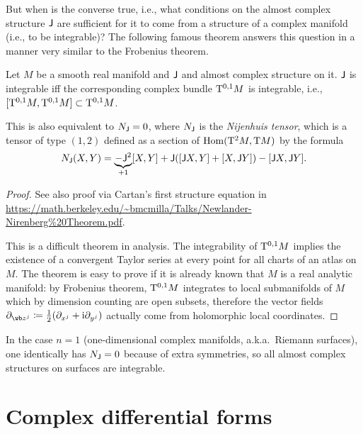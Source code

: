 But when is the converse true, i.e., what conditions on the almost complex structure $\mathsf{J}$ are sufficient for it to come from a structure of a complex manifold (i.e., to be integrable)? The following famous theorem answers this question in a manner very similar to the Frobenius theorem.

\begin{thm}
    Let $M$ be a smooth real manifold and $\mathsf{J}$ and almost complex structure on it. $\mathsf{J}$ is integrable iff the corresponding complex bundle $\mathrm{T}^{0,1}M$ is integrable, i.e., $[\mathrm{T}^{0,1}M,\mathrm{T}^{0,1}M]\subset \mathrm{T}^{0,1}M$.
    
    This is also equivalent to $N_{\mathsf{J}}=0$, where $N_{\mathsf{J}}$ is the \emph{Nijenhuis tensor}, which is a tensor of type $(1,2)$ defined as a section of $\operatorname{Hom}(\mathrm{T}^2M,\mathrm{T} M)$ by the formula
    \[N_{\mathsf{J}}(X,Y)=\underbrace{-\mathsf{J}^2}_{+1}[X,Y]+\mathsf{J}([\mathsf{J} X,Y]+[X,\mathsf{J} Y])-[\mathsf{J} X,\mathsf{J} Y].\]
\end{thm}
\begin{proof}
    See also proof via Cartan's first structure equation  in \url{https://math.berkeley.edu/~bmcmilla/Talks/Newlander-Nirenberg%20Theorem.pdf}.
    
    This is a difficult theorem in analysis. The integrability of $\mathrm{T}^{0,1}M$ implies the existence of a convergent Taylor series at every point for all charts of an atlas on $M$. The theorem is easy to prove if it is already known that $M$ is a real analytic manifold: by Frobenius theorem, $\mathrm{T}^{0,1}M$ integrates to local submanifolds of $M$ which by dimension counting are open subsets, therefore the vector fields $\partial_{\wb z^j}\coloneqq\frac12(\partial_{x^j}+\i\partial_{y^j})$ actually come from holomorphic local coordinates.
\end{proof}

\begin{rem}
    In the case $n=1$ (one-dimensional complex manifolds, a.k.a.\ Riemann surfaces), one identically has $N_{\mathsf{J}}=0$ because of extra symmetries, so all almost complex structures on surfaces are integrable.
\end{rem}





\section{Complex differential forms}

